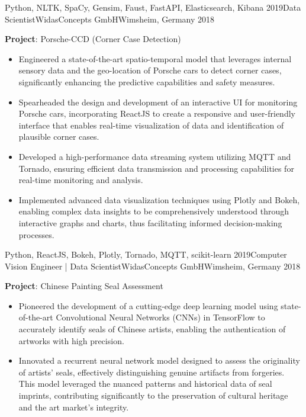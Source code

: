 \begin{experiences}
{\begin{itemize}
	\end{itemize}
}
{Python, NLTK, SpaCy, Gensim, Faust, FastAPI, Elasticsearch, Kibana}
\emptySeparator
\experience
{2019}{Data Scientist}{WidasConcepts GmbH}{Wimsheim, Germany}
{2018} {
	\vspace{0.1cm}
	\textbf{Project}: Porsche-CCD (Corner Case Detection)
	\begin{itemize}
		\item Engineered a state-of-the-art spatio-temporal model that leverages internal sensory data and the geo-location of Porsche cars to detect corner cases, significantly enhancing the predictive capabilities and safety measures.
		\item Spearheaded the design and development of an interactive UI for monitoring Porsche cars, incorporating ReactJS to create a responsive and user-friendly interface that enables real-time visualization of data and identification of plausible corner cases.
		\item Developed a high-performance data streaming system utilizing MQTT and Tornado, ensuring efficient data transmission and processing capabilities for real-time monitoring and analysis.
		\item Implemented advanced data visualization techniques using Plotly and Bokeh, enabling complex data insights to be comprehensively understood through interactive graphs and charts, thus facilitating informed decision-making processes.
	\end{itemize}
}
{Python, ReactJS, Bokeh, Plotly, Tornado, MQTT, scikit-learn}
\emptySeparator
\experience
{2019}{Computer Vision Engineer | Data Scientist}{WidasConcepts GmbH}{Wimsheim, Germany}
{2018} {
	\vspace{0.1cm}
	\textbf{Project}: Chinese Painting Seal Assessment
	\begin{itemize}
		\item Pioneered the development of a cutting-edge deep learning model using state-of-the-art Convolutional Neural Networks (CNNs) in TensorFlow to accurately identify seals of Chinese artists, enabling the authentication of artworks with high precision.
		\item Innovated a recurrent neural network model designed to assess the originality of artists' seals, effectively distinguishing genuine artifacts from forgeries. This model leveraged the nuanced patterns and historical data of seal imprints, contributing significantly to the preservation of cultural heritage and the art market's integrity.


\end{itemize}}
\end{experiences}
